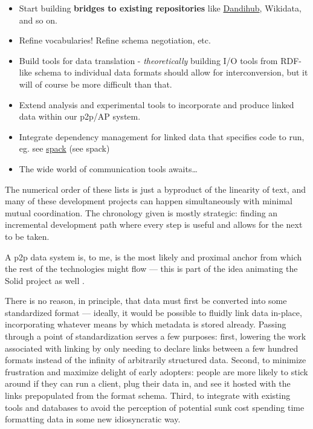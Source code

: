 \documentclass[10pt]{article}
\begin{document}
\begin{multicols}{2}
\begin{itemize}
\item
  Start building \textbf{bridges to existing repositories} like
  \href{https://gui.dandiarchive.org/\#/}{Dandihub}, Wikidata, and so
  on.
\item
  Refine vocabularies! Refine schema negotiation, etc.
\item
  Build tools for data translation - \emph{theoretically} building I/O
  tools from RDF-like schema to individual data formats should allow for
  interconversion, but it will of course be more difficult than that.
\item
  Extend analysis and experimental tools to incorporate and produce
  linked data within our p2p/AP system.
\item
  Integrate dependency management for linked data that specifies code to
  run, eg. see \href{https://spack.readthedocs.io/en/latest/\#}{spack}
  (see spack)
\item
  The wide world of communication tools awaits\ldots{}
\end{itemize}

The numerical order of these lists is just a byproduct of the linearity
of text, and many of these development projects can happen
simultaneously with minimal mutual coordination. The chronology given is
mostly strategic: finding an incremental development path where every
step is useful and allows for the next to be taken.

A p2p data system is, to me, is the most likely and proximal anchor from
which the rest of the technologies might flow --- this is part of the
idea animating the Solid project as well \cite{berners-leeSociallyAwareCloud2009, finleyTimBernersLeeInventor2017, barabasDefendingInternetFreedom2017, sambraSolidPlatformDecentralized2016} .

There is no reason, in principle, that data must first be converted into
some standardized format --- ideally, it would be possible to fluidly
link data in-place, incorporating whatever means by which metadata is
stored already. Passing through a point of standardization serves a few
purposes: first, lowering the work associated with linking by only
needing to declare links between a few hundred formats instead of the
infinity of arbitrarily structured data. Second, to minimize frustration
and maximize delight of early adopters: people are more likely to stick
around if they can run a client, plug their data in, and see it hosted
with the links prepopulated from the format schema. Third, to integrate
with existing tools and databases to avoid the perception of potential
sunk cost spending time formatting data in some new idiosyncratic way.


\end{multicols}
\end{document}
